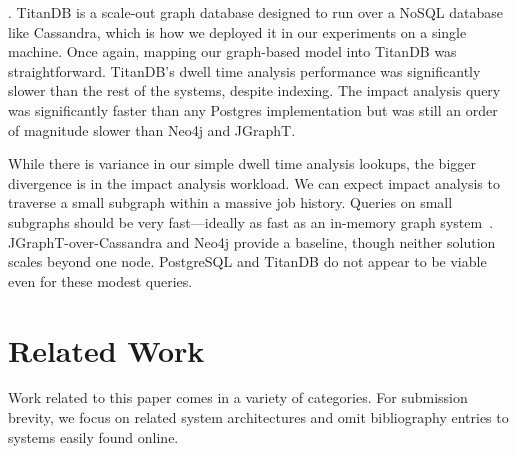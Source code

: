 \documentclass{sig-alternate}
\begin{document}
. TitanDB is a scale-out graph database designed to run over a NoSQL database like Cassandra, which is how we deployed it in our experiments on a single machine. %
Once again, mapping our graph-based model into TitanDB was straightforward.
TitanDB's dwell time analysis performance was significantly slower than the rest of the systems, despite indexing.
The impact analysis query was significantly faster than any Postgres implementation but was still an order of magnitude slower than Neo4j and JGraphT.

\smallitembot
While there is variance in our simple dwell time analysis lookups, the bigger divergence is in the impact analysis workload.
We can expect impact analysis to traverse a small subgraph within a massive job history. Queries on small subgraphs should be very fast---ideally as fast as an in-memory graph system~\cite{mcsherry2015scalability}. JGraphT-over-Cassandra and Neo4j provide a baseline, though neither solution scales beyond one node. PostgreSQL and TitanDB do not appear to be viable even for these modest queries.





\section{Related Work}
\label{sec:relwork}
Work related to this paper comes in a variety of categories. 
For submission brevity, we focus on related system architectures and omit bibliography entries to systems easily found online.
\end{document}
